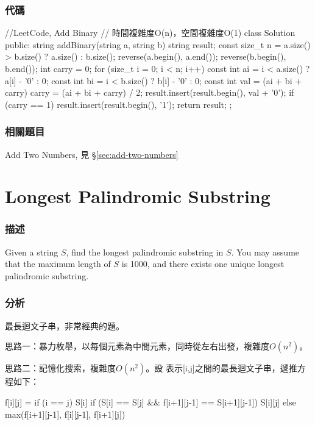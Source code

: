 \subsubsection{代碼}
\begin{Code}
//LeetCode, Add Binary
// 時間複雜度O(n)，空間複雜度O(1)
class Solution {
public:
    string addBinary(string a, string b) {
        string result;
        const size_t n = a.size() > b.size() ? a.size() : b.size();
        reverse(a.begin(), a.end());
        reverse(b.begin(), b.end());
        int carry = 0;
        for (size_t i = 0; i < n; i++) {
            const int ai = i < a.size() ? a[i] - '0' : 0;
            const int bi = i < b.size() ? b[i] - '0' : 0;
            const int val = (ai + bi + carry) %
            carry = (ai + bi + carry) / 2;
            result.insert(result.begin(), val + '0');
        }
        if (carry == 1) {
            result.insert(result.begin(), '1');
        }
        return result;
    }
};
\end{Code}


\subsubsection{相關題目}
\begindot
\item Add Two Numbers, 見 \S \ref{sec:add-two-numbers}
\myenddot


\section{Longest Palindromic Substring} %
\label{sec:longest-palindromic-substring}


\subsubsection{描述}
Given a string $S$, find the longest palindromic substring in $S$. You may assume that the maximum length of $S$ is 1000, and there exists one unique longest palindromic substring.


\subsubsection{分析}
最長迴文子串，非常經典的題。

思路一：暴力枚舉，以每個元素為中間元素，同時從左右出發，複雜度$O(n^2)$。

思路二：記憶化搜索，複雜度$O(n^2)$。設 表示[i,j]之間的最長迴文子串，遞推方程如下：
\begin{Code}
f[i][j] = if (i == j) S[i]
          if (S[i] == S[j] && f[i+1][j-1] == S[i+1][j-1]) S[i][j]
          else max(f[i+1][j-1], f[i][j-1], f[i+1][j])
\end{Code}

